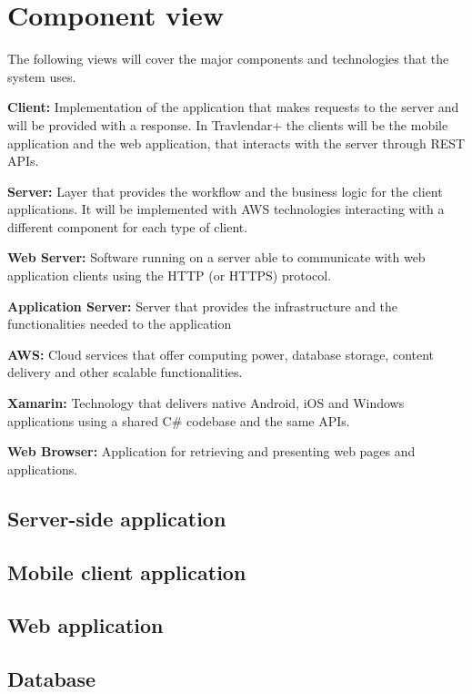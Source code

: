\section{Component view}
\label{sec:comp_view}
The following views will cover the major components and technologies that the system uses.

\textbf{Client:} Implementation of the application that makes requests to the server and will be provided with a response. In Travlendar+ the clients will be the mobile application and the web application, that interacts with the server through REST APIs.

\textbf{Server:} Layer that provides the workflow and the business logic for the client applications. It will be implemented with AWS technologies interacting with a different component for each type of client.

\textbf{Web Server:} Software running on a server able to communicate with web application clients using the HTTP (or HTTPS) protocol.

\textbf{Application Server:} Server that provides the infrastructure and the functionalities needed to the application

\textbf{AWS:} Cloud services that offer computing power, database storage, content delivery and other scalable functionalities.

\textbf{Xamarin:} Technology that delivers native Android, iOS and Windows applications using a shared C\# codebase and the same APIs.

\textbf{Web Browser:} Application for retrieving and presenting web pages and applications.

\subsection*{Server-side application}

\subsection*{Mobile client application}

\subsection*{Web application}

\subsection*{Database}

